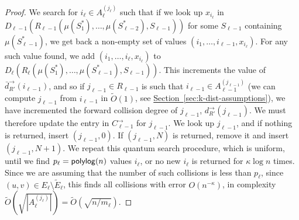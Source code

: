 \documentclass{article}
\renewcommand{\sec}[1]{\hyperref[sec:#1]{Section~\ref*{sec:#1}}}
\renewcommand{\>}{\rangle}
\newcommand{\<}{\langle}
\renewcommand{\(}{\left(}
\renewcommand{\)}{\right)}
\begin{document}
\begin{proof}
We search for $i_{\ell}\in A_{\ell}^{(j_{\ell})}$ such that if we look up $x_{i_{\ell}}$ in $D_{\ell-1}(R_{\ell-1}(\mu(S_1^*),\dots,\mu(S_{\ell-2}^*),S_{\ell-1}))$ for some $S_{\ell-1}$ containing $\mu(S_{\ell-1}^*)$, we get back a non-empty set of values $(i_1,\dots,i_{\ell-1},x_{i_{\ell}})$. For any such value found, we add $(i_1,\dots,i_{\ell},x_{i_{\ell}})$ to $D_{\ell}(R_{\ell}(\mu(S_1^*),\dots,\mu(S_{\ell-1}^*),S_{\ell-1}))$. This increments the value of $\bar{d}_{R'}^{\rightarrow}(i_{\ell-1})$, and so if $j_{\ell-1}\in R_{\ell-1}$ is such that $i_{\ell-1}\in A_{\ell-1}^{(j_{\ell-1})}$ (we can compute $j_{\ell-1}$ from $i_{\ell-1}$ in $\widetilde{O}(1)$, see \sec{k-dist-assumptions}), we have incremented the forward collision degree of $j_{\ell-1}$, $d_{R'}^{\rightarrow}(j_{\ell-1})$. We must therefore update the entry in $C^{\rightarrow}_{\ell-1}$ for $j_{\ell-1}$. We look up $j_{\ell-1}$, and if nothing is returned, insert $(j_{\ell-1},0)$. If $(j_{\ell-1},N)$ is returned, remove it and insert $(j_{\ell-1},N+1)$. 
We repeat this quantum search procedure, which is uniform, until we find $p_{\ell}={\sf polylog}(n)$ values $i_{\ell}$, or no new $i_{\ell}$ is returned for $\kappa\log n$ times. Since  we are assuming that the number of such collisions is less than $p_{\ell}$, since $(u,v)\in E_{\ell}\setminus\tilde{E}_{\ell}$, this finds all collisions with error $O(n^{-\kappa})$, in complexity 
	$\widetilde{O}\left(\sqrt{|A_{\ell}^{(j_{\ell})}|}\right)=\widetilde{O}(\sqrt{n/m_{\ell}})$.
\end{proof}
\end{document}
